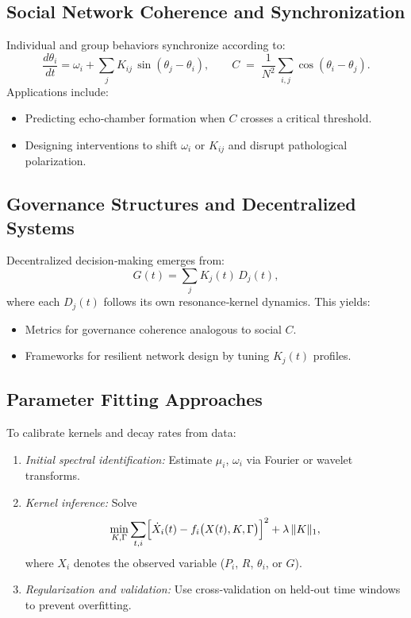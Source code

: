 \subsection{Social Network Coherence and Synchronization}
Individual and group behaviors synchronize according to:
\[
\frac{d\theta_i}{dt}
= \omega_i
+ \sum_j K_{ij}\,\sin(\theta_j - \theta_i),
\qquad
C \;=\;\frac{1}{N^2}\sum_{i,j}\cos(\theta_i - \theta_j).
\]
Applications include:
\begin{itemize}
  \item Predicting echo‐chamber formation when $C$ crosses a critical threshold.  
  \item Designing interventions to shift $\omega_i$ or $K_{ij}$ and disrupt pathological polarization.
\end{itemize}

\subsection{Governance Structures and Decentralized Systems}
Decentralized decision‐making emerges from:
\[
G(t)
= \sum_j K_j(t)\,D_j(t),
\]
where each $D_j(t)$ follows its own resonance‐kernel dynamics. This yields:
\begin{itemize}
  \item Metrics for governance coherence analogous to social $C$.  
  \item Frameworks for resilient network design by tuning $K_j(t)$ profiles.
\end{itemize}

\subsection{Parameter Fitting Approaches}
To calibrate kernels and decay rates from data:
\begin{enumerate}
  \item \emph{Initial spectral identification:} Estimate $\mu_i$, $\omega_i$ via Fourier or wavelet transforms.  
  \item \emph{Kernel inference:} Solve
  \[
    \min_{K,\Gamma}
    \sum_{t,i}
    \Bigl[\dot{X}_i(t) - f_i\bigl(X(t),K,\Gamma\bigr)\Bigr]^2
    + \lambda\,\|K\|_1,
  \]
  where $X_i$ denotes the observed variable ($P_i$, $R$, $\theta_i$, or $G$).  
  \item \emph{Regularization and validation:} Use cross‐validation on held‐out time windows to prevent overfitting.
\end{enumerate}


